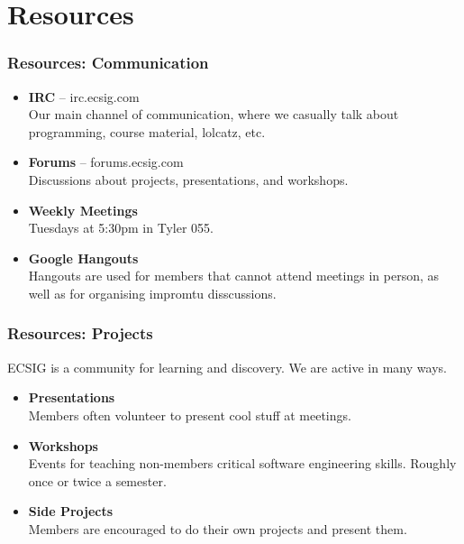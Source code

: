 \documentclass{beamer}
\begin{document}
\section{Resources}
\begin{frame}\frametitle{Resources: Communication}

	\begin{itemize}
		\item {\bf IRC} -- irc.ecsig.com\\
Our main channel of communication, where we casually talk about programming, course material, lolcatz, etc.
		\item {\bf Forums} -- forums.ecsig.com \\
Discussions about projects, presentations, and workshops.
		\item {\bf Weekly Meetings}\\
Tuesdays at 5:30pm in Tyler 055.
		\item {\bf Google Hangouts}\\
Hangouts are used for members that cannot attend meetings in person, as well as for organising impromtu disscussions.\\
	\end{itemize}
\end{frame}

\begin{frame}\frametitle{Resources: Projects}
ECSIG is a community for learning and discovery. We are active in many ways.

	\begin{itemize} 
		\item {\bf Presentations}\\
Members often volunteer to present cool stuff at meetings.
		\item {\bf Workshops}\\
Events for teaching non-members critical software engineering skills. Roughly once or twice a semester.
		\item {\bf Side Projects}\\
Members are encouraged to do their own projects and present them.
	\end{itemize}

	\end{frame}
\end{document}
